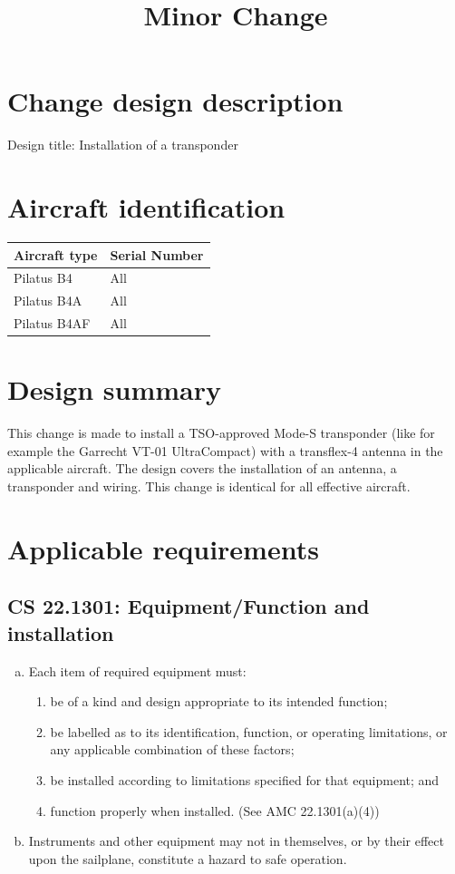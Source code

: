 \documentclass{article}
\begin{document}
\title{Minor Change}
\author{}
\date{}
\maketitle

\section{Change design description}
Design title: Installation of a transponder

\section{Aircraft identification}
\begin{tabular}{|l|l|}
\hline
Aircraft type & Serial Number \\
\hline
Pilatus B4 & All \\
Pilatus B4A & All \\
Pilatus B4AF & All \\
\hline
\end{tabular}

\section{Design summary}
This change is made to install a TSO-approved Mode-S transponder (like for example the Garrecht VT-01 UltraCompact) with a transflex-4 antenna in the applicable aircraft. The design covers the installation of an antenna, a transponder and wiring. This change is identical for all effective aircraft.

\section{Applicable requirements}
\subsection{CS 22.1301:  Equipment/Function and installation}
\begin{enumerate}[(a)]
\item Each item of required equipment must:
	\begin{enumerate}[(1)]
          \item be of a kind and design appropriate to its intended function;
          \item be labelled as to its identification, function, or operating limitations, or any applicable combination of these factors;
          \item be installed according to limitations specified for that equipment; and
          \item function properly when installed. (See AMC 22.1301(a)(4))
	\end{enumerate}
\item Instruments and other equipment may not in themselves, or by their effect upon the sailplane, constitute a hazard to safe operation.
\end{enumerate}
\end{document}
